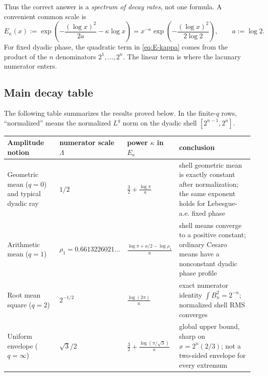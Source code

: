 \documentclass[11pt,oneside]{article}
\theoremstyle{definition}
\theoremstyle{remark}
\begin{document}
Thus the correct answer is a \emph{spectrum of decay rates}, not one formula.  A convenient
common scale is
\begin{equation}
 E_\kappa(x)
 :=\exp\!\left(-\frac{(\log x)^2}{2a}-\kappa\log x\right)
 =x^{-\kappa}\exp\!\left(-\frac{(\log x)^2}{2\log2}\right),
 \qquad a:=\log2.
 \label{eq:E-kappa}
\end{equation}
For fixed dyadic phase, the quadratic term in \eqref{eq:E-kappa} comes from the product of
the $n$ denominators $2^1,\dots,2^n$.  The linear term is where the lacunary numerator
enters.

\subsection{Main decay table}
\label{subsec:main-table}

The following table summarizes the results proved below.  In the finite-$q$ rows,
``normalized'' means the normalized $L^q$ norm on the dyadic shell
$[2^{n-1},2^n]$.

\begin{center}
\begin{tabularx}{\textwidth}{@{}>{\raggedright\arraybackslash}p{}
  >{\centering\arraybackslash}p{}
  >{\centering\arraybackslash}p{}
  X@{}}
\toprule
Amplitude notion & numerator scale $\Lambda$ & power $\kappa$ in $E_\kappa$ & conclusion\\
\midrule
Geometric mean ($q=0$) and typical dyadic ray
 & $1/2$
 & $\displaystyle \frac32+\frac{\log\pi}{a}$
 & shell geometric mean is exactly constant after normalization; the same exponent holds
   for Lebesgue-a.e. fixed phase\\[0.7em]
Arithmetic mean ($q=1$)
 & $\rho_1=0.6613226021\ldots$
 & $\displaystyle \frac{\log\pi+a/2-\log\rho_1}{a}$
 & shell means converge to a positive constant; ordinary Cesaro means have a nonconstant
   dyadic phase profile\\[0.7em]
Root mean square ($q=2$)
 & $2^{-1/2}$
 & $\displaystyle \frac{\log(2\pi)}{a}$
 & exact numerator identity $\int B_n^2=2^{-n}$; normalized shell RMS converges\\[0.7em]
Uniform envelope ($q=\infty$)
 & $\sqrt3/2$
 & $\displaystyle \frac32+\frac{\log(\pi/\sqrt3)}{a}$
 & global upper bound, sharp on $x=2^n(2/3)$; not a two-sided envelope for every extremum\\
\bottomrule
\end{tabularx}
\end{center}
\end{document}

